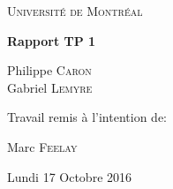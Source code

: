 \documentclass[]{report}
\begin{document}
	\begin{titlepage}
		\centering
		{\scshape\LARGE Université de Montréal \par}
		\vspace{1.5cm}
		{\huge\bfseries Rapport TP 1\par}
		\vspace{2cm}
		{\Large Philippe \textsc{Caron}\\Gabriel \textsc{Lemyre}\par}
		\vfill
		Travail remis à l'intention de:\par
		Marc \textsc{Feelay}
		
		\vfill
		
		{\large Lundi 17 Octobre 2016\par}
	\end{titlepage}
	\newpage
	\begin{normalsize}

\end{normalsize}
\end{document}
